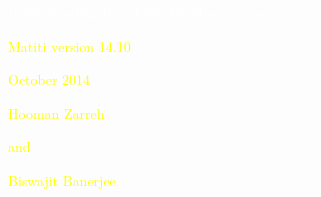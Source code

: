 \documentclass[11pt,fleqn]{book} %
\begin{document}
  \begingroup
    \thispagestyle{empty}
    \AddToShipoutPicture*{\BackgroundPic} %
    \centering
    \vspace*{1cm}
    \par\normalfont\fontsize{35}{35}\sffamily\selectfont
    \textcolor{white}{Understanding the Matiti Peridynamics programs}\par %
    \vspace*{0.5cm}
    {\Huge \textcolor{yellow}{Matiti version 14.10}}\par
    {\Huge \textcolor{yellow}{October 2014}}\par
    \vspace*{1cm}
    {\Huge \textcolor{yellow}{Hooman Zarreh}}\par %
    {\Huge \textcolor{yellow}{and}}\par %
    {\Huge \textcolor{yellow}{Biswajit Banerjee}}\par %
  \endgroup


 
\end{document}
